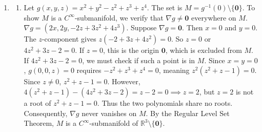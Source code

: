 \documentclass{article}
\begin{document}
\begin{enumerate}[label=\fbox{\arabic*}]
        The splitting field $K_n = \mathbb{Q}(\alpha_0, \alpha_1, \dots, \alpha_{2^n-1})$ is the field generated by these roots. Note that $\alpha_k = 2 \cos((2k+1)\theta_0)$, which can be expressed as a polynomial in $2 \cos \theta_0 = \alpha_0$ (specifically, via Chebyshev polynomials). Therefore, $K_n$ is simply generated by $\alpha_0$:
        $K_n = \mathbb{Q}\left( \cos\left( \frac{\pi}{2^{n+1}} \right) \right)$.
        
        The field $\mathbb{Q}(\zeta)$ is the $2^{n+2}$-th cyclotomic field, and its Galois group over $\mathbb{Q}$ is $\mathrm{Gal}(\mathbb{Q}(\zeta)/\mathbb{Q}) \cong (\mathbb{Z}/2^{n+2}\mathbb{Z})^\times$.
        $K_n$ is the maximal real subfield of $\mathbb{Q}(\zeta)$, because it is the fixed field of complex conjugation (which corresponds to the automorphism $\zeta \mapsto \zeta^{-1}$, or multiplication by $-1$ in the index group).
        Thus, the Galois group of $K_n$ over $\mathbb{Q}$ is the quotient:
        $\mathrm{Gal}(K_n/\mathbb{Q}) \cong (\mathbb{Z}/2^{n+2}\mathbb{Z})^\times / \{ \pm 1 \}$.
        
        It is a standard result in number theory that for $m \ge 3$, $(\mathbb{Z}/2^m\mathbb{Z})^\times \cong \mathbb{Z}/2\mathbb{Z} \times \mathbb{Z}/2^{m-2}\mathbb{Z}$, generated by $-1$ and $5$.
        Taking the quotient by $\{ \pm 1 \}$ removes the $\mathbb{Z}/2\mathbb{Z}$ factor, leaving a cyclic group of order $2^{m-2}$.
        For $m = n+2$, we conclude that:
        $\mathrm{Gal}(K_n/\mathbb{Q}) \cong \mathbb{Z}/2^n\mathbb{Z}$.

  \item %
        \begin{enumerate}[label=(\arabic*)]
          \item Let $g(x, y, z) = x^2 + y^2 - z^2 + z^3 + z^4$. The set is $M = g^{-1}(0) \setminus \{ \bm{0} \}$.
          To show $M$ is a $C^\infty$-submanifold, we verify that $\nabla g \neq \bm{0}$ everywhere on $M$.
          $\nabla g = (2x, 2y, -2z + 3z^2 + 4z^3)$.
          Suppose $\nabla g = \bm{0}$. Then $x = 0$ and $y = 0$. 
          The $z$-component gives $z(-2 + 3z + 4z^2) = 0$. So $z = 0$ or $4z^2 + 3z - 2 = 0$.
          If $z = 0$, this is the origin $\bm{0}$, which is excluded from $M$.
          If $4z^2 + 3z - 2 = 0$, we must check if such a point is in $M$. Since $x=y=0$, $g(0, 0, z) = 0$ requires $-z^2 + z^3 + z^4 = 0$, meaning $z^2(z^2 + z - 1) = 0$. Since $z \neq 0$, $z^2 + z - 1 = 0$.
          However, $4(z^2 + z - 1) - (4z^2 + 3z - 2) = z - 2 = 0 \implies z = 2$, but $z=2$ is not a root of $z^2+z-1=0$. Thus the two polynomials share no roots.
          Consequently, $\nabla g$ never vanishes on $M$. By the Regular Level Set Theorem, $M$ is a $C^\infty$-submanifold of $\mathbb{R}^3 \setminus \{\bm{0}\}$.
          

\end{enumerate}
\end{enumerate}
\end{document}
